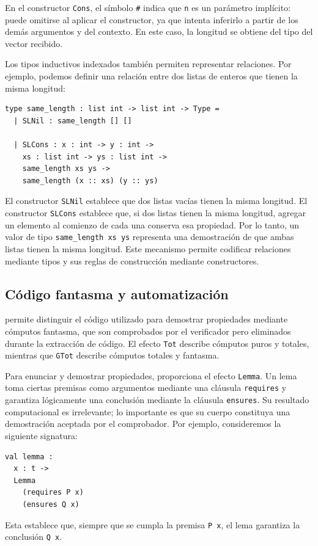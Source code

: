 \documentclass[a4paper,	11pt]{report}
\begin{document}
En el constructor \lstinline|Cons|,
el símbolo \lstinline|#| indica que \lstinline|n| es un parámetro implícito:
puede omitirse al aplicar el constructor,
ya que \fstar{} intenta inferirlo a partir de los demás argumentos y del contexto.
En este caso,
la longitud se obtiene del tipo del vector recibido.

Los tipos inductivos indexados también permiten representar relaciones.
Por ejemplo,
podemos definir una relación entre dos listas de enteros que tienen la misma longitud:
\begin{lstlisting}
type same_length : list int -> list int -> Type =
  | SLNil : same_length [] []

  | SLCons : x : int -> y : int ->
    xs : list int -> ys : list int ->
    same_length xs ys ->
    same_length (x :: xs) (y :: ys)
\end{lstlisting}
El constructor \lstinline|SLNil| establece que dos listas vacías tienen la misma longitud.
El constructor \lstinline|SLCons| establece que,
si dos listas tienen la misma longitud,
agregar un elemento al comienzo de cada una conserva esa propiedad.
Por lo tanto,
un valor de tipo \lstinline|same_length xs ys| representa una demostración
de que ambas listas tienen la misma longitud.
Este mecanismo permite codificar relaciones mediante tipos y sus reglas de construcción mediante constructores.

\subsection*{Código fantasma y automatización}
\fstar{} permite distinguir el código utilizado para demostrar propiedades mediante cómputos fantasma,
que son comprobados por el verificador pero eliminados durante la extracción de código.
El efecto \lstinline|Tot| describe cómputos puros y totales,
mientras que \lstinline|GTot| describe cómputos totales y fantasma.

Para enunciar y demostrar propiedades,
\fstar{} proporciona el efecto \lstinline|Lemma|.
Un lema toma ciertas premisas como argumentos mediante una cláusula \lstinline|requires|
y garantiza lógicamente una conclusión mediante la cláusula \lstinline|ensures|.
Su resultado computacional es irrelevante;
lo importante es que su cuerpo constituya una demostración aceptada por el comprobador.
Por ejemplo, consideremos la siguiente signatura:
\begin{lstlisting}
val lemma :
  x : t ->
  Lemma
    (requires P x)
    (ensures Q x)
\end{lstlisting}
Esta establece que, siempre que se cumpla la premisa \lstinline|P x|,
el lema garantiza la conclusión \lstinline|Q x|.
\end{document}
